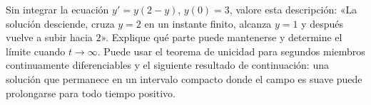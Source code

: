 Sin integrar la ecuación \(y'=y(2-y)\), \(y(0)=3\), valore esta descripción: «La solución desciende, cruza \(y=2\) en un instante finito, alcanza \(y=1\) y después vuelve a subir hacia \(2\)». Explique qué parte puede mantenerse y determine el límite cuando \(t\to\infty\). Puede usar el teorema de unicidad para segundos miembros continuamente diferenciables y el siguiente resultado de continuación: una solución que permanece en un intervalo compacto donde el campo es suave puede prolongarse para todo tiempo positivo.
